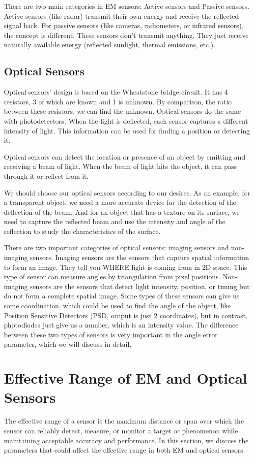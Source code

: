\documentclass{article}
\begin{document}
There are two main categories in EM sensors: Active sensors and Passive sensors. Active sensors (like radar) transmit their own energy and receive the reflected signal back. For passive sensors (like cameras, radiometers, or infrared sensors), the concept is different. These sensors don't transmit anything. They just receive naturally available energy (reflected sunlight, thermal emissions, etc.).
\subsection{Optical Sensors}
Optical sensors' design is based on the Wheatstone bridge circuit. It has 4 resistors, 3 of which are known and 1 is unknown. By comparison, the ratio between these resistors, we can find the unknown. Optical sensors do the same with photodetectors. When the light is deflected, each sensor captures a different intensity of light. This information can be used for finding a position or detecting it.

Optical sensors can detect the location or presence of an object by emitting and receiving a beam of light. When the beam of light hits the object, it can pass through it or reflect from it.

We should choose our optical sensors according to our desires. As an example, for a transparent object, we need a more accurate device for the detection of the deflection of the beam. And for an object that has a texture on its surface, we need to capture the reflected beam and use the intensity and angle of the reflection to study the characteristics of the surface.

There are two important categories of optical sensors: imaging sensors and non-imaging sensors.
Imaging sensors are the sensors that capture spatial information to form an image. They tell you WHERE light is coming from in 2D space. This type of sensor can measure angles by triangulation from pixel positions.
Non-imaging sensors are the sensors that detect light intensity, position, or timing but do not form a complete spatial image. Some types of these sensors can give us some coordination, which could be used to find the angle of the object, like Position Sensitive Detectors (PSD, output is just 2 coordinates), but in contrast, photodiodes just give us a number, which is an intensity value. The difference between these two types of sensors is very important in the angle error parameter, which we will discuss in detail.

\section{Effective Range of EM and Optical Sensors}
The effective range of a sensor is the maximum distance or span over which the sensor can reliably detect, measure, or monitor a target or phenomenon while maintaining acceptable accuracy and performance. In this section, we discuss the parameters that could affect the effective range in both EM and optical sensors. 
\end{document}
